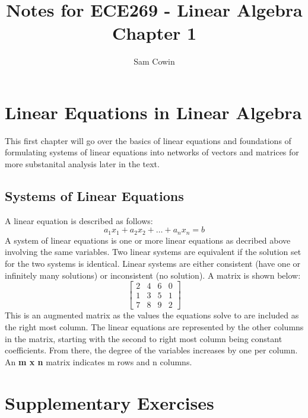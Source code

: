 \documentclass[12pt]{article}
\begin{document}
\title{Notes for ECE269 - Linear Algebra \\
\large Chapter 1}
\author{Sam Cowin}

\maketitle

\section{Linear Equations in Linear Algebra}
This first chapter will go over the basics of linear equations and foundations of formulating systems of linear equations %
into networks of vectors and matrices for more substanital analysis later in the text.

\subsection{Systems of Linear Equations}
A linear equation is described as follows:
\begin{equation}
    a_1x_1 + a_2x_2 + \dots + a_nx_n = b
\end{equation}
A system of linear equations is one or more linear equations as decribed above involving the same variables. %
Two linear systems are equivalent if the solution set for the two systems is identical. Linear systems are either %
consistent (have one or infinitely many solutions) or inconsistent (no solution).
\newline
\newline
\noindent A matrix is shown below:
$$
\begin{bmatrix}
    2 & 4 & 6 & 0 \\
    1 & 3 & 5 & 1 \\
    7 & 8 & 9 & 2
\end{bmatrix}
$$
\newline
This is an augmented matrix as the values the equations solve to are included as the right most column. The linear equations are represented%
 by the other columns in the matrix, starting with the second to right most column being constant coefficients. From there, the degree of the variables%
 increases by one per column. An \textbf{m x n} matrix indicates m rows and n columns. 
 \newline
 \newline

\section{Supplementary Exercises}
\end{document}
